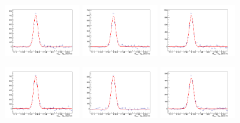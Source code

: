 \begin{figure}[!h]
\begin{center}
\includegraphics[width=0.3\textwidth]{figures/Dstar/pp13TeV/multi_trial/residual_plot_std_bkg_func_4-4dot5GeV.png} 
\includegraphics[width=0.3\textwidth]{figures/Dstar/pp13TeV/multi_trial/residual_plot_std_bkg_func_4dot5-5GeV.png}
\includegraphics[width=0.3\textwidth]{figures/Dstar/pp13TeV/multi_trial/residual_plot_std_bkg_func_5-5dot5GeV.png} 

\includegraphics[width=0.3\textwidth]{figures/Dstar/pp13TeV/multi_trial/residual_plot_std_bkg_func_5dot5-6GeV.png} 
\includegraphics[width=0.3\textwidth]{figures/Dstar/pp13TeV/multi_trial/residual_plot_std_bkg_func_6-6dot5GeV.png}
\includegraphics[width=0.3\textwidth]{figures/Dstar/pp13TeV/multi_trial/residual_plot_std_bkg_func_6dot5-7GeV.png} 


\end{center}
\end{figure}
